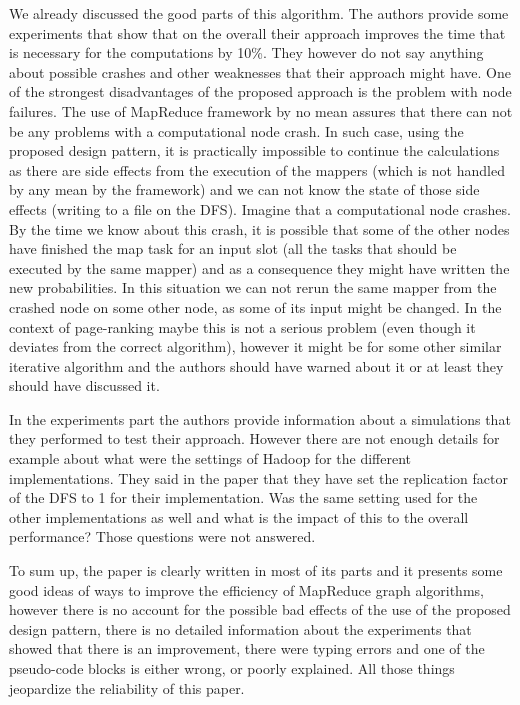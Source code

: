 \documentclass[12pt]{article}
\theoremstyle{plain}
\begin{document}
  We already discussed the good parts of this algorithm. The authors provide
  some experiments that show that on the overall their approach improves the 
  time that is necessary for the computations by 10\%. They however do not say
  anything about possible crashes and other weaknesses that their approach
  might have. One of the strongest disadvantages of the proposed approach is
  the problem with node failures. The use of MapReduce framework by no mean
  assures that there can not be any problems with a computational node crash.
  In such case, using the proposed design pattern, it is practically impossible
  to continue the calculations as there are side effects from the execution of
  the mappers (which is not handled by any mean by the framework) and we can
  not know the state of those side effects (writing to a file on the DFS).
  Imagine that a computational node crashes. By the time we know about this
  crash, it is possible that some of the other nodes have finished the map task
  for an input slot (all the tasks that should be executed by the same mapper)
  and as a consequence they might have written the new probabilities. In this
  situation we can not rerun the same mapper from the crashed node on some other
  node, as some of its input might be changed. In the context of page-ranking
  maybe this is not a serious problem (even though it deviates from the correct
  algorithm), however it might be for some other similar iterative algorithm
  and the authors should have warned about it or at least they should have
  discussed it.  

In the experiments part the authors provide information about a simulations
that they performed to test their approach. However there are not enough details
for example about what were the settings of Hadoop for the different
implementations. They said in the paper that they have set the replication
factor of the DFS to 1 for their implementation. Was the same setting used for
the other implementations as well and what is the impact of this to the overall 
performance? Those questions were not answered.

To sum up, the paper is clearly written in most of its parts and it presents
some good ideas of ways to improve the efficiency of MapReduce graph algorithms,
however there is no account for the possible bad effects of the use of the 
proposed design pattern, there is no detailed information about the experiments
that showed that there is an improvement, there were typing errors and one of
the pseudo-code blocks is either wrong, or poorly explained. All those things
jeopardize the reliability of this paper.
\end{document}
